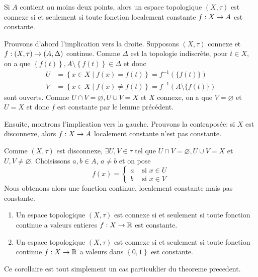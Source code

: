 \documentclass[french]{article}
\begin{document}
\begin{theoreme}
  Si $A$ contient au moins deux points, alors un espace topologique $(X, \tau)$ est connexe si et seulement si toute fonction localement constante $f: X \rightarrow A$ est constante.

  \tcblower
  \begin{preuve}
    Prouvons d'abord l'implication vers la droite. Supposons $(X, \tau)$ connexe et $f: (X, \tau) \rightarrow (A, \Delta)$ continue. Comme $\Delta$ est la topologie indiscrète, pour $t \in X$, on a que $\left\{ f(t) \right\}, A \setminus \left\{ f(t) \right\} \in \Delta$ et donc
    \begin{align*}
      U &= \left\{ x \in X \mid f(x) = f(t) \right\} = f^{-1}(\{ f(t)\}) \\
      V &= \left\{ x \in X \mid f(x) \not = f(t) \right\} = f^{-1}( A \setminus \{ f(t)\}) 
    \end{align*}
    sont ouverts. Comme $U \cap V = \varnothing , U \cup V = X$ et $X$ connexe, on a que $V = \varnothing $ et $U = X$ et donc  $f$ est constante par le lemme précédent.

    \par Ensuite, montrons l'implication vers la gauche. Prouvons la contraposée: si $X$ est disconnexe, alors $f: X \rightarrow A$ localement constante n'est pas constante.
    \par Comme $(X, \tau)$ est disconnexe, $\exists U, V \in \tau$ tel que $U \cap V = \varnothing , U \cup V = X$ et $U, V \not = \varnothing $. Choisissons $a, b \in A$, $a \not = b$ et on pose
    $$f(x) = \begin{cases}
      a & \text{ si } x\in U\\
      b & \text{ si } x \in V
    \end{cases}$$
    Nous obtenons alors une fonction continue, localement constante mais pas constante.
  \end{preuve}
\end{theoreme}

\begin{cor}
  \begin{enumerate}
    \item Un espace topologique $(X, \tau)$ est connexe si et seulement si toute fonction continue a valeurs entieres $f: X \rightarrow \mathbb{R}$ est constante.
    \item Un espace topologique $(X, \tau)$ est connexe si et seulement si toute fonction continue $f: X \rightarrow \mathbb{R}$ a valeurs dans $\left\{ 0, 1 \right\}$ est constante.
  \end{enumerate}
\end{cor}
Ce corollaire est tout simplement un cas particuklier du theoreme precedent.
\end{document}
